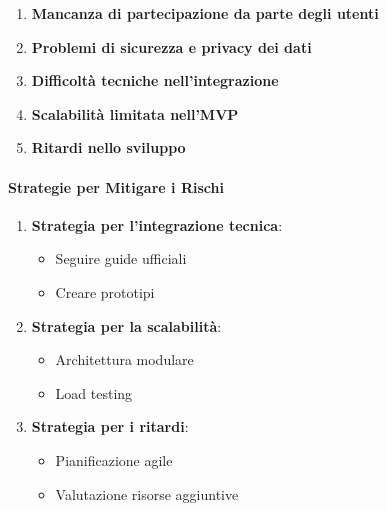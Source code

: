 \begin{enumerate}
    \item \textbf{Mancanza di partecipazione da parte degli utenti}
    \item \textbf{Problemi di sicurezza e privacy dei dati}
    \item \textbf{Difficoltà tecniche nell'integrazione}
    \item \textbf{Scalabilità limitata nell'MVP}
    \item \textbf{Ritardi nello sviluppo}
\end{enumerate}

\paragraph{Strategie per Mitigare i Rischi}

\begin{enumerate}
    \item \textbf{Strategia per l'integrazione tecnica}:
    \begin{itemize}
        \item Seguire guide ufficiali
        \item Creare prototipi
    \end{itemize}
    
    \item \textbf{Strategia per la scalabilità}:
    \begin{itemize}
        \item Architettura modulare
        \item Load testing
    \end{itemize}
    
    \item \textbf{Strategia per i ritardi}:
    \begin{itemize}
        \item Pianificazione agile
        \item Valutazione risorse aggiuntive
    \end{itemize}
\end{enumerate}